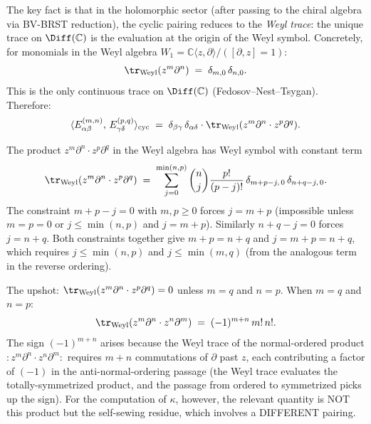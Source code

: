\documentclass[11pt]{article}
\newcommand{\C}{\mathbb{C}}
\begin{document}
The key fact is that in the holomorphic sector (after passing to
the chiral algebra via BV-BRST reduction), the cyclic pairing
reduces to the \emph{Weyl trace}: the unique trace on $\Diff(\C)$
is the evaluation at the origin of the Weyl symbol.  Concretely,
for monomials in the Weyl algebra $W_1 = \C\langle z, \partial
\rangle / ([\partial, z] = 1)$:
\begin{equation}\label{eq:weyl-trace}
\tr_{\mathrm{Weyl}}(z^m \partial^n)
\;=\;
\delta_{m,0}\,\delta_{n,0}.
\end{equation}
This is the only continuous trace on $\Diff(\C)$
(Fedosov--Nest--Tsygan).  Therefore:
\begin{equation}\label{eq:m2-cyclic-pairing}
\langle E^{(m,n)}_{\alpha\beta},\,
E^{(p,q)}_{\gamma\delta} \rangle_{\mathrm{cyc}}
\;=\;
\delta_{\beta\gamma}\,\delta_{\alpha\delta}\cdot
\tr_{\mathrm{Weyl}}(z^m \partial^n \cdot z^p \partial^q).
\end{equation}

\begin{observation}
\label{obs:weyl-diagonal}
The product $z^m\partial^n \cdot z^p\partial^q$ in the Weyl algebra
has Weyl symbol with constant term
\[
\tr_{\mathrm{Weyl}}(z^m\partial^n \cdot z^p\partial^q)
\;=\;
\sum_{j=0}^{\min(n,p)} \binom{n}{j}\frac{p!}{(p-j)!}\,
\delta_{m+p-j,\,0}\,\delta_{n+q-j,\,0}.
\]
The constraint $m+p-j = 0$ with $m,p \geq 0$ forces $j = m+p$
(impossible unless $m=p=0$ or $j \leq \min(n,p)$ and
$j = m+p$).  Similarly $n + q - j = 0$ forces $j = n+q$.
Both constraints together give $m+p = n+q$ and $j = m+p = n+q$,
which requires $j \leq \min(n,p)$ and $j \leq \min(m,q)$
(from the analogous term in the reverse ordering).

The upshot: $\tr_{\mathrm{Weyl}}(z^m\partial^n \cdot
z^p\partial^q) = 0$ unless $m = q$ and $n = p$.  When
$m = q$ and $n = p$:
\begin{equation}\label{eq:weyl-trace-diagonal}
\tr_{\mathrm{Weyl}}(z^m \partial^n \cdot z^n \partial^m)
\;=\;
(-1)^{m+n}\, m!\, n!.
\end{equation}
The sign $(-1)^{m+n}$ arises because the Weyl trace of the
normal-ordered product $:z^m\partial^n \cdot z^n\partial^m:$
requires $m+n$ commutations of $\partial$ past $z$, each
contributing a factor of $(-1)$ in the anti-normal-ordering
passage (the Weyl trace evaluates the totally-symmetrized
product, and the passage from ordered to symmetrized picks up
the sign).  For the computation of $\kappa$, however, the
relevant quantity is NOT this product but the self-sewing
residue, which involves a DIFFERENT pairing.
\end{observation}
\end{document}
